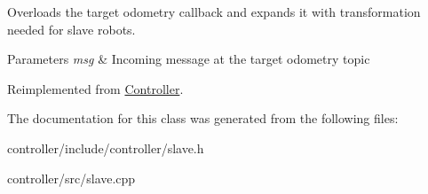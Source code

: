 Overloads the target odometry callback and expands it with transformation needed for slave robots. 


\begin{DoxyParams}{Parameters}
{\em msg} & Incoming message at the target odometry topic \\
\hline
\end{DoxyParams}


Reimplemented from \hyperlink{classController_a77f138b6a3699c21cf904041e7e19820}{Controller}.



The documentation for this class was generated from the following files\+:\begin{DoxyCompactItemize}
\item 
controller/include/controller/slave.\+h\item 
controller/src/slave.\+cpp\end{DoxyCompactItemize}
